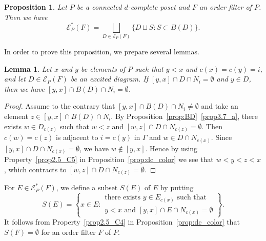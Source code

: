 \documentclass[10pt]{amsart}
\newtheorem{prop}[theo]{Proposition}
\newtheorem{lemm}[theo]{Lemma}
\theoremstyle{definition}
\theoremstyle{remark}
\newcommand\EE{\mathcal{E}}
\begin{document}
\begin{prop}
\label{prop:E*}
Let $P$ be a connected $d$-complete poset and $F$ an order filter of $P$.
Then we have
\begin{equation}
\label{eq:E*}
\EE^*_P(F) = \bigsqcup_{D \in \EE_P(F)} \{ D \sqcup S : S \subset B(D) \}.
\end{equation}
\end{prop}

In order to prove this proposition, we prepare several lemmas.

\begin{lemm}
\label{lem:interval_BD}
Let $x$ and $y$ be elements of $P$ such that $y<x$ and $c(x) = c(y) = i$, 
and let $D\in \EE_P(F)$ be an excited diagram.
If $[y,x] \cap D \cap N_i = \emptyset$ and $y \in D$, 
then we have $[y,x] \cap B(D) \cap N_i = \emptyset$.
\end{lemm}

\begin{proof}
Assume to the contrary that $[y,x] \cap B(D) \cap N_i \neq \emptyset$ 
and take an element $z \in [y,x] \cap B(D) \cap N_i$.
By Proposition~\ref{prop:BD}~\ref{prop3.7_a}, there exists $w \in D_{c(z)}$ such that 
$w < z$ and $[w,z] \cap D \cap N_{c(z)} = \emptyset$.
Then $c(w) = c(z)$ is adjacent to $i = c(y)$ in $\Gamma$ and $w \in D \cap N_{c(x)}$.
Since $[y,x] \cap D \cap N_{c(x)} = \emptyset$, we have $w \not\in [y,x]$.
Hence by using Property~\ref{prop2.5_C5} in Proposition~\ref{prop:dc_color} 
we see that $w < y < z < x$, which contracts to $[w,z] \cap D \cap N_{c(z)} = \emptyset$.
\end{proof}

For $E \in \EE^*_P(F)$, we define a subset $S(E)$ of $E$ by putting
\begin{equation}
\label{eq:def_SE}
S(E)
 = 
\left\{
x \in E :
\begin{matrix}
\text{there exists $y \in E_{c(x)}$ such that } \\
\text{$y<x$ and $[y,x] \cap E \cap N_{c(x)} = \emptyset$}
\end{matrix}
\right\}.
\end{equation}
It follows from Property~\ref{prop2.5_C4} in Proposition~\ref{prop:dc_color} that $S(F) = \emptyset$ 
for an order filter $F$ of $P$.
\end{document}
